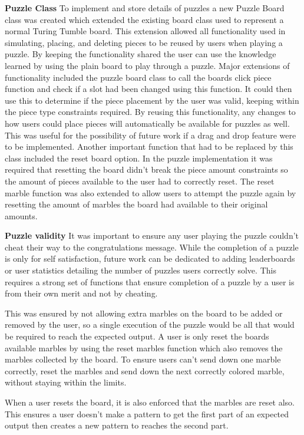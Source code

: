 \documentclass{l4proj}
\begin{document}
\textbf{Puzzle Class}
To implement and store details of puzzles a new Puzzle Board class was created which extended the existing board class used to represent a normal Turing Tumble board. This extension allowed all functionality used in simulating, placing, and deleting pieces to be reused by users when playing a puzzle. By keeping the functionality shared the user can use the knowledge learned by using the plain board to play through a puzzle. Major extensions of functionality included the puzzle board class to call the boards click piece function and check if a slot had been changed using this function. It could then use this to determine if the piece placement by the user was valid, keeping within the piece type constraints required. By reusing this functionality, any changes to how users could place pieces will automatically be available for puzzles as well. This was useful for the possibility of future work if a drag and drop feature were to be implemented. Another important function that had to be replaced by this class included the reset board option. In the puzzle implementation it was required that resetting the board didn't break the piece amount constraints so the amount of pieces available to the user had to correctly reset. The reset marble function was also extended to allow users to attempt the puzzle again by resetting the amount of marbles the board had available to their original amounts. 

\textbf{Puzzle validity}
It was important to ensure any user playing the puzzle couldn't cheat their way to the congratulations message. While the completion of a puzzle is only for self satisfaction, future work can be dedicated to adding leaderboards or user statistics detailing the number of puzzles users correctly solve. This requires a strong set of functions that ensure completion of a puzzle by a user is from their own merit and not by cheating. 

This was ensured by not allowing extra marbles on the board to be added or removed by the user, so a single execution of the puzzle would be all that would be required to reach the expected output. A user is only reset the boards available marbles by using the reset marbles function which also removes the marbles collected by the board. To ensure users can't send down one marble correctly, reset the marbles and send down the next correctly colored marble, without staying within the limits.

When a user resets the board, it is also enforced that the marbles are reset also. This ensures a user doesn't make a pattern to get the first part of an expected output then creates a new pattern to reaches the second part.
\end{document}
